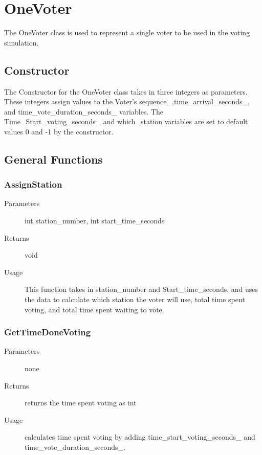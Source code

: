 %

\chapter{OneVoter}
The OneVoter class is used to represent a single voter to be used in the voting simulation.

\section{Constructor}
The Constructor for the OneVoter class takes in three integers as parameters.  These integers assign values to the Voter's sequence\_,time\_arrival\_seconds\_, and time\_vote\_duration\_seconds\_ variables.  The Time\_Start\_voting\_seconds\_ and which\_station variables are set to default values 0 and -1 by the constructor.

\section{General Functions}

\subsection{AssignStation}
\begin{description}
\item[Parameters] int station\_number, int start\_time\_seconds
\item[Returns] void
\item[Usage] This function takes in station\_number and Start\_time\_seconds, and uses the data to calculate which station the voter will use, total time spent voting, and total time spent waiting to vote.
\end{description}

\subsection{GetTimeDoneVoting}
\begin{description}
\item[Parameters] none
\item[Returns] returns the time spent voting as int
\item[Usage] calculates time spent voting by adding time\_start\_voting\_seconds\_ and time\_vote\_duration\_seconds\_.
\end{description}

